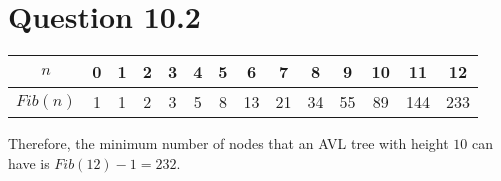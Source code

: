 \documentclass[a4paper,12pt]{article}
\begin{document}
\section*{Question 10.2}

\begin{center}
	\begin{tabular}{c|ccccccccccccc}
		\toprule
		$n$ & 0 & 1 & 2 & 3 & 4 & 5 & 6 & 7 & 8 & 9 & 10 & 11 & 12 \\
		\midrule
		$Fib(n)$ & 1 & 1 & 2 & 3 & 5 & 8 & 13 & 21 & 34 & 55 & 89 & 144 & 233 \\
		\bottomrule
	\end{tabular}
\end{center}

Therefore, the minimum number of nodes that an AVL tree with height $10$ can have is $Fib(12) - 1 = 232$.
\end{document}
